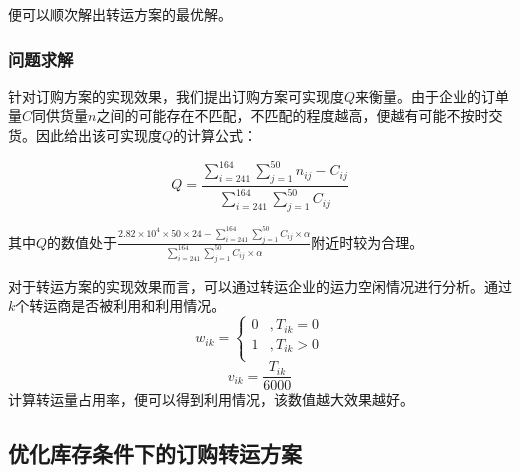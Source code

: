 \documentclass{my_paper}
\begin{document}
便可以顺次解出转运方案的最优解。

\subsubsection{问题求解}
针对订购方案的实现效果，我们提出订购方案可实现度$Q$来衡量。由于企业的订单量$C$同供货量$n$之间的可能存在不匹配，不匹配的程度越高，便越有可能不按时交货。因此给出该可实现度$Q$的计算公式：

\begin{equation}
Q = \frac{\sum\limits^{164}_{i=241}\sum\limits^{50}_{j=1}n_{ij}-C_{ij}}{\sum\limits^{164}_{i=241}\sum\limits^{50}_{j=1}C_{ij}}
\label{Q}
\end{equation}

其中$Q$的数值处于$\frac{2.82\times 10^4 \times 50 \times 24 -\sum\limits^{164}_{i=241}\sum\limits^{50}_{j=1}C_{ij}\times \alpha}{\sum\limits^{164}_{i=241}\sum\limits^{50}_{j=1}C_{ij}\times \alpha}$附近时较为合理。

对于转运方案的实现效果而言，可以通过转运企业的运力空闲情况进行分析。通过$k$个转运商是否被利用和利用情况。
\begin{equation}
w_{ik} = \begin{cases}
    0 &, T_{ik} = 0\\
    1 &, T_{ik} > 0\\
\end{cases}
\label{wik}
\end{equation}
\begin{equation}
v_{ik} = \frac{T_{ik}}{6000}
\label{vik}
\end{equation}
计算转运量占用率，便可以得到利用情况，该数值越大效果越好。

\subsection{优化库存条件下的订购转运方案}
\end{document}
